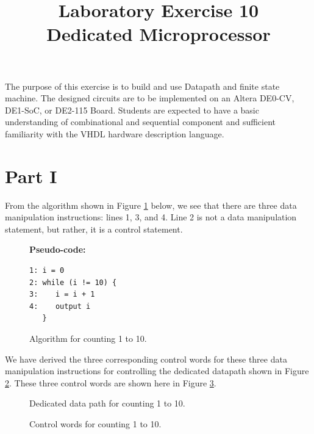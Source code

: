 \documentclass{article}
\title{Laboratory Exercise 10 \\ Dedicated Microprocessor}
\author{}
\date{}
\begin{document}
\maketitle

The purpose of this exercise is to build and use Datapath and finite state machine. The designed circuits are to be implemented on an Altera DE0-CV, DE1-SoC, or DE2-115 Board.
Students are expected to have a basic understanding of combinational and sequential component and sufficient familiarity with the VHDL hardware description language.

\section*{Part I}

From the algorithm shown in Figure \ref{fig:algorithm} below, we see that there are three data manipulation instructions: lines 1, 3, and 4. Line 2 is not a data manipulation statement, but rather, it is a control statement.

\begin{figure}[H]
    \centering
    \begin{minipage}{0.45\textwidth}
        \textbf{Pseudo-code:}
        \begin{verbatim}
1: i = 0
2: while (i != 10) {
3:    i = i + 1
4:    output i
   }
        \end{verbatim}
    \end{minipage}
    \hfill
    \begin{minipage}{0.45\textwidth}
        \centering
        \resizebox{\textwidth}{!}{}
    \end{minipage}
    \caption{Algorithm for counting 1 to 10.}
    \label{fig:algorithm}
\end{figure}

We have derived the three corresponding control words for these three data manipulation instructions for controlling the dedicated datapath shown in Figure \ref{fig:datapath}. These three control words are shown here in Figure \ref{fig:control_words}.

\begin{figure}[H]
    \centering
    \resizebox{0.8\textwidth}{!}{}
    \caption{Dedicated data path for counting 1 to 10.}
    \label{fig:datapath}
\end{figure}

\begin{figure}[H]
    \centering
    
    \caption{Control words for counting 1 to 10.}
    \label{fig:control_words}
\end{figure}
\end{document}
